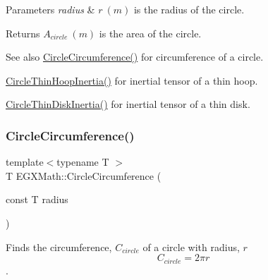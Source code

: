 \begin{DoxyParams}{Parameters}
{\em radius} & $ r\ (m)$ is the radius of the circle. \\
\hline
\end{DoxyParams}
\begin{DoxyReturn}{Returns}
$ A_{circle}\ (m)$ is the area of the circle. 
\end{DoxyReturn}
\begin{DoxySeeAlso}{See also}
\mbox{\hyperlink{group___e_g_x_math-_geometry-2_d-_circle_gadb55695b75a06a3f3534494eb767e18e}{Circle\+Circumference()}} for circumference of a circle. 

\mbox{\hyperlink{group___e_g_x_math-_geometry-2_d-_circle_ga5c84d0d64d475e472a75f4f10b4a0c26}{Circle\+Thin\+Hoop\+Inertia()}} for inertial tensor of a thin hoop. 

\mbox{\hyperlink{group___e_g_x_math-_geometry-2_d-_circle_ga2ccb30846977757242697e70983bbec5}{Circle\+Thin\+Disk\+Inertia()}} for inertial tensor of a thin disk. 
\end{DoxySeeAlso}
\mbox{\label{group___e_g_x_math-_geometry-2_d-_circle_gadb55695b75a06a3f3534494eb767e18e}} 
\subsubsection{\texorpdfstring{Circle\+Circumference()}{CircleCircumference()}}
{\footnotesize\ttfamily template$<$typename T $>$ \\
T E\+G\+X\+Math\+::\+Circle\+Circumference (\begin{DoxyParamCaption}\item[{const T}]{radius }\end{DoxyParamCaption})}



Finds the circumference, $C_{circle}$ of a circle with radius, $r$ \[ C_{circle}=2 \pi r \]. 


